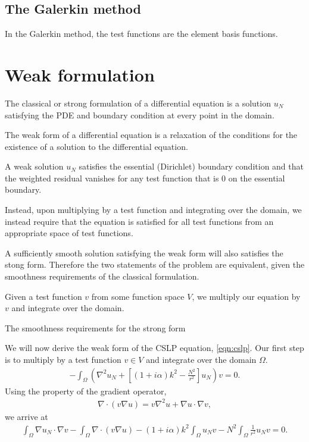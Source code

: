 \subsection{The Galerkin method}

In the Galerkin method, the test functions are the element basis functions.






\section{Weak formulation}

The classical or strong formulation of a differential equation is a solution $u_N$ satisfying the PDE and boundary condition at every point in the domain.


The weak form of a differential equation is a relaxation of the conditions for the existence of a solution to the differential equation.

A weak solution $u_N$ satisfies the essential (Dirichlet) boundary condition and that the weighted residual vanishes for any test function that is 0 on the essential boundary.

Instead, upon multiplying by a test function and integrating over the domain, we instead require that the equation is satisfied for all test functions from an appropriate space of test functions.


A sufficiently smooth solution satisfying the weak form will also satisfies the stong form.
Therefore the two statements of the problem are equivalent, given the smoothness requirements of the classical formulation.


Given a test function $v$ from some function space $V$, we multiply our equation by $v$ and integrate over the domain.

The smoothness requirements for the strong form 



We will now derive the weak form of the CSLP equation, \eqref{eqn:cslp}.
Our first step is to multiply by a test function $v\in V$ and integrate over the domain $\Omega$.
\begin{align}
	-\int_\Omega \left(\nabla^2 u_N + \left[ (1+i\alpha)k^2-\frac{N^2}{r^2}\right]u_N \right) v = 0.
\end{align}
Using the property of the gradient operator,
\begin{align}
	\nabla \cdot ( v \nabla u) = v \nabla^2 u + \nabla u \cdot \nabla v,
\end{align}
we arrive at
\begin{align}
	\int_\Omega \nabla u_N \cdot \nabla v 
  - \int_\Omega \nabla \cdot (v \nabla u ) 
  - (1+i\alpha)k^2 \int_\Omega u_N v 
  - N^2 \int_\Omega \frac{1}{r^2} u_N v = 0.
\end{align}


